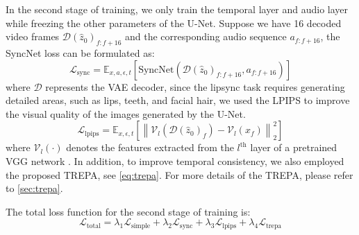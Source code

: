 In the second stage of training, we only train the temporal layer and audio layer while freezing the other parameters of the U-Net. Suppose we have 16 decoded video frames $\mathcal{D}(\hat{z}_0)_{f:f+16}$ and the corresponding audio sequence $a_{f:f+16}$, the SyncNet loss can be formulated as:
\begin{equation}
    \mathcal{L}_{\text{sync}} = \mathbb{E}_{x, a, \epsilon, t} \left[ \text{SyncNet}(\mathcal{D}(\hat{z}_0)_{f:f+16}, a_{f:f+16}) \right]
\end{equation}
where $\mathcal{D}$ represents the VAE decoder, since the lipsync task requires generating detailed areas, such as lips, teeth, and facial hair, we used the LPIPS \cite{zhang2018unreasonable} to improve the visual quality of the images generated by the U-Net.
\begin{equation}
    \mathcal{L}_{\text{lpips}} = \mathbb{E}_{x, \epsilon, t}
    \left[ \left\| \mathcal{V}_l(\mathcal{D}(\hat{z}_0)_f) - \mathcal{V}_l(x_f) \right\|_2^2 \right]
\end{equation}
where $\mathcal{V}_l(\cdot)$ denotes the features extracted from the $l^{\text{th}}$ layer of a pretrained VGG network \cite{simonyan2014very}. In addition, to improve temporal consistency, we also employed the proposed TREPA, see \cref{eq:trepa}. For more details of the TREPA, please refer to \cref{sec:trepa}.

The total loss function for the second stage of training is:
\begin{equation}
    \mathcal{L}_{\text{total}} = \lambda_{1} \mathcal{L}_{\text{simple}} + \lambda_{2} \mathcal{L}_{\text{sync}} + \lambda_{3} \mathcal{L}_{\text{lpips}} + \lambda_{4} \mathcal{L}_{\text{trepa}}
\end{equation}




